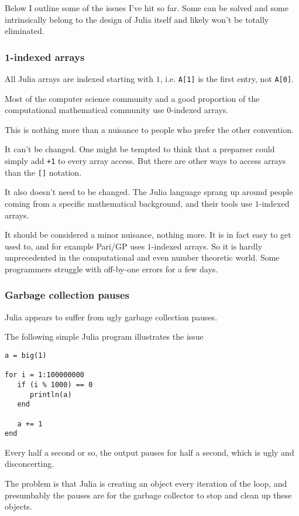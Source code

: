 \documentclass[a4paper,10pt]{article}
\newcommand{\code}{\lstinline}
\begin{document}
Below I outline some of the issues I've hit so far. Some can be solved and some intrinsically
belong to the design of Julia itself and likely won't be totally eliminated.

\subsubsection{1-indexed arrays}

All Julia arrays are indexed starting with $1$, i.e. \code{A[1]} is the first entry, not \code{A[0]}.

Most of the computer science community and a good proportion of the computational mathematical
community use $0$-indexed arrays.

This is nothing more than a nuisance to people who prefer the other convention. 

It can't be changed. One might be tempted to think that a preparser could simply add \code{+1} to
every array access. But there are other ways to access arrays than the \code{[]} notation.

It also doesn't need to be changed. The Julia language sprang up around people coming from a
specific mathematical background, and their tools use $1$-indexed arrays.

It should be considered a minor nuisance, nothing more. It is in fact easy to get used to,
and for example Pari/GP uses $1$-indexed arrays. So it is hardly unprecedented in the
computational and even number theoretic world. Some programmers struggle with off-by-one errors
for a few days.

\subsubsection{Garbage collection pauses}

Julia appears to suffer from ugly garbage collection pauses.

The following simple Julia program illustrates the issue

\begin{lstlisting}
a = big(1)

for i = 1:100000000
   if (i % 1000) == 0
      println(a)
   end
   
   a += 1
end
\end{lstlisting}

Every half a second or so, the output pauses for half a second, which is ugly and disconcerting.

The problem is that Julia is creating an object every iteration of the loop, and presumbably the
pauses are for the garbage collector to stop and clean up these objects.
\end{document}
